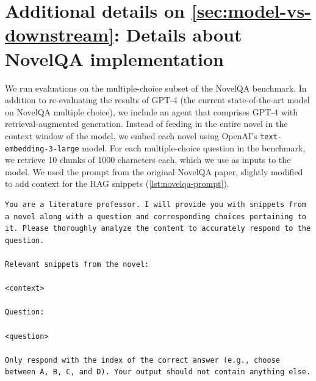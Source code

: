 \documentclass{article}
\begin{document}
\begin{table}
\begin{adjustbox}{width=1.3\textwidth,center}
\begin{tabular}
\end{tabular}
\end{adjustbox}
\caption{A survey of recent agent benchmarks shows that 7/17 benchmarks do not include holdout sets for evaluating agents’ performance and do not indicate plans to do so. Of those with holdout sets, only 5/10 hold out sets are at the appropriate generality level. We made our best guess for the level of generality based on the description of the benchmark's purpose in its paper or repository.}
\label{table:agent-bench-comparison}
\end{table}

\section{Additional details on \cref{sec:model-vs-downstream}: Details about NovelQA implementation}
\label{appendix:novelqa-implementation}

We run evaluations on the multiple-choice subset of the NovelQA benchmark. In addition to re-evaluating the results of GPT-4 (the current state-of-the-art model on NovelQA multiple choice), we include an agent that comprises GPT-4 with retrieval-augmented generation. Instead of feeding in the entire novel in the context window of the model, we embed each novel using OpenAI's \texttt{text-embedding-3-large} model. For each multiple-choice question in the benchmark, we retrieve 10 chunks of 1000 characters each, which we use as inputs to the model. We used the prompt from the original NovelQA paper, slightly modified to add context for the RAG snippets (\cref{lst:novelqa-prompt}).

\begin{lstlisting}[language=plantuml, basicstyle=\ttfamily\scriptsize, breaklines=true, caption={Prompt used for RAG implementation on NovelQA. This is the prompt from the original NovelQA paper. We only make the slight modification of adding in the retrieved context.}, label={lst:novelqa-prompt}, float=h]
You are a literature professor. I will provide you with snippets from a novel along with a question and corresponding choices pertaining to it. Please thoroughly analyze the content to accurately respond to the question.

Relevant snippets from the novel: 

<context>

Question: 

<question>

Only respond with the index of the correct answer (e.g., choose between A, B, C, and D). Your output should not contain anything else.
\end{lstlisting}
\end{document}
